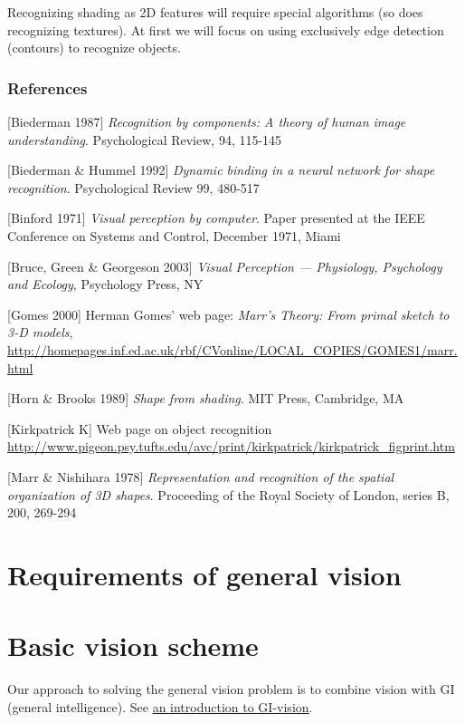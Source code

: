 Recognizing shading as 2D features will require special algorithms (so does recognizing textures). At first we will focus on using exclusively edge detection (contours) to recognize objects.

\subsubsection{References}

[Biederman 1987] \emph{Recognition by components: A theory of human image understanding}. Psychological Review, 94, 115-145

[Biederman \& Hummel 1992] \emph{Dynamic binding in a neural network for shape recognition}. Psychological Review 99, 480-517 

[Binford 1971] \emph{Visual perception by computer}. Paper presented at the IEEE Conference on Systems and Control, December 1971, Miami

[Bruce, Green \& Georgeson 2003] \emph{Visual Perception --- Physiology, Psychology and Ecology}, Psychology Press, NY

[Gomes 2000] Herman Gomes' web page: \emph{Marr's Theory: From primal sketch to 3-D models}, \href{http://homepages.inf.ed.ac.uk/rbf/CVonline/LOCAL_COPIES/GOMES1/marr.html}{http://homepages.inf.ed.ac.uk/rbf/CVonline/LOCAL\_COPIES/GOMES1/marr.html}

[Horn \& Brooks 1989] \emph{Shape from shading}. MIT Press, Cambridge, MA

[Kirkpatrick K] Web page on object recognition \href{http://www.pigeon.psy.tufts.edu/avc/print/kirkpatrick/kirkpatrick_figprint.htm}{http://www.pigeon.psy.tufts.edu/avc/print/kirkpatrick/kirkpatrick\_figprint.htm}

[Marr \& Nishihara 1978] \emph{Representation and recognition of the spatial organization of 3D shapes}. Proceeding of the Royal Society of London, series B, 200, 269-294 

\section{Requirements of general vision}

\underconst

\section{Basic vision scheme}

Our approach to solving the general vision problem is to combine vision with GI (general intelligence). See \href{Vis-Cognition.htm}{an introduction to GI-vision}.

